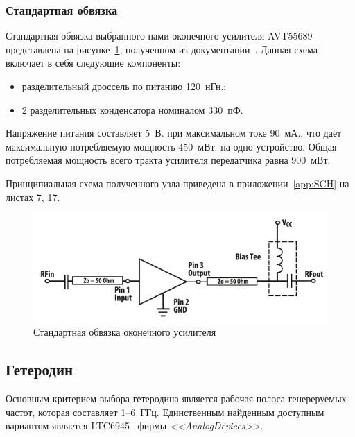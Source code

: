 \documentclass[utf8x, 14pt, oneside, a4paper]{article}
\begin{document}
			
			
			\subsubsection{Стандартная обвязка}
				Стандартная обвязка выбранного нами оконечного усилителя AVT55689 представлена на рисунке~\ref{fig:обвязка:ОконечныйУсилитель}, полученном из документации~\cite{bib:ОконечныйУсилитель}. Данная схема включает в себя следующие компоненты:
				\begin{itemize}
					\item разделительный дроссель по питанию 120~нГн.;
					\item 2 разделительных конденсатора номиналом 330~пФ.
				\end{itemize}
			
				Напряжение питания составляет 5~В. при максимальном токе 90~мА., что даёт максимальную потребляемую мощность 450~мВт. на одно устройство. Общая потребляемая мощность всего тракта усилителя передатчика равна 900~мВт.
				
				Принципиальная схема полученного узла приведена в приложении~\ref{app:SCH} на листах 7, 17.
				\begin{figure}[h!]
					\centering
					\includegraphics[width=0.7\linewidth]{"Обвязка оконечного усилителя"}
					\caption{Стандартная обвязка оконечного усилителя}
					\label{fig:обвязка:ОконечныйУсилитель}
				\end{figure}
		
		\subsection{Гетеродин}
			Основным критерием выбора гетеродина является рабочая полоса генереруемых частот, которая составляет 1--6~ГГц. Единственным найденным доступным вариантом является LTC6945~\cite{bib:Генератор} фирмы \textit{<<AnalogDevices>>}.
\end{document}
